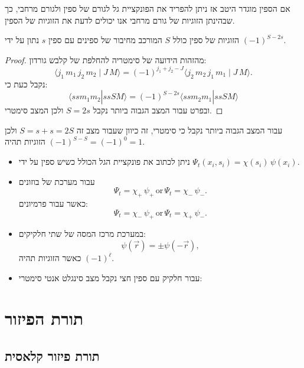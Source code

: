 \documentclass{tstextbook}
\begin{document}
\begin{proposition}
אם הספין מוגדר היטב אז ניתן להפריד את הפונקציית גל לגורם של ספין ולגורם מרחבי, כך שבהינתן הזוגיות של גורם מרחבי אנו יכולים לדעת את הזוגיות של הספין.

\end{proposition}
\begin{proposition}
הזוגיות של ספין כולל \(S\) המורכב מחיבור של ספינים עם ספין \(s\) נתון על ידי \((-1)^{S-2s}\).

\end{proposition}
\begin{proof}
מהזהות הידועה של סימטריה להחלפת של קלבש גורדון:
$$\langle j_{1}\,m_{1}\,j_{2}\,m_{2}\mid J\,M\rangle=(-1)^{j_{1}+j_{2}-J}\langle j_{2}\,m_{2}\,j_{1}\,m_{1}\mid J\,M\rangle.$$
נקבל כעת כי:
$$\langle ssm_{1}m_{2}|ssSM \rangle =(-1)^{S-2s}\langle ssm_{2}m_{1}|ssSM \rangle $$
ובפרט עבור המצב הגבוה ביותר נקבל \(S=2s\) ולכן המצב סימטרי.

\end{proof}
\begin{corollary}
עבור המצב הגבוה ביותר נקבל כי סימטרי, זה כיוון שעבור מצב זה \(S=s+s=2S\) ולכן הזוגיות תהיה \((-1)^{S-S}=(-1)^{0}=1\).

\end{corollary}
\begin{summary}
  \begin{itemize}
    \item ניתן לכתוב את פונקציית הגל הכולל כשיש ספין על ידי \(\Psi_{t}(x_{i},s_{i})=\chi(s_{i})\,\psi(x_{i})\).
    \item עבור מערכת של בוזונים $$\Psi_{t}=\chi_{+}\,\psi_{+}\,\mathrm{or}\,\Psi_{t}=\chi_{-}\,\psi_{-}.$$
כאשר עבור פרמיונים:
$$\Psi_{t}=\chi_{-}\,\psi_{+}\,\mathrm{or}\,\Psi_{t}=\chi_{+}\,\psi_{-}.$$
    \item במערכת מרכז המסה של שתי חלקיקים:
$$\psi({\vec{r}})=\pm\psi(-{\vec{r}}),$$
כאשר הזוגיות תהיה \((-1)^{\ell}\).
    \item עבור חלקיק עם ספין חצי נקבל מצב סינגלט אנטי סימטרי:
  \end{itemize}
\end{summary}
\section{תורת הפיזור}

\subsection{תורת פיזור קלאסית}
\end{document}
